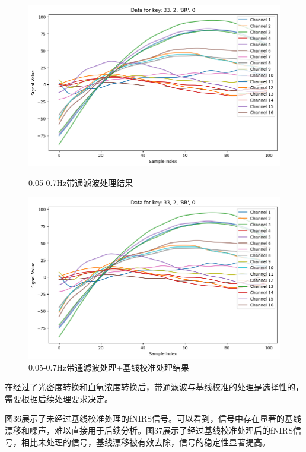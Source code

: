 \documentclass[a4paper,12pt]{article}
\begin{document}
\begin{figure}[h!]
    \begin{minipage}[t]{0.48\textwidth}
        \centering
        \includegraphics[width=\linewidth]{images/Design/fNIRS_processing/005-07+nobaseline.png}
        \caption{0.05-0.7Hz带通滤波处理结果}
    \end{minipage}
    \hfill
    \begin{minipage}[t]{0.48\textwidth}
        \centering
        \includegraphics[width=\linewidth]{images/Design/fNIRS_processing/005-07+baseline.png}
        \caption{0.05-0.7Hz带通滤波处理+基线校准处理结果}
    \end{minipage}
\end{figure}

\clearpage
在经过了光密度转换和血氧浓度转换后，带通滤波与基线校准的处理是选择性的，需要根据后续处理要求决定。

图36展示了未经过基线校准处理的fNIRS信号。可以看到，信号中存在显著的基线漂移和噪声，难以直接用于后续分析。图37展示了经过基线校准处理后的fNIRS信号，相比未处理的信号，基线漂移被有效去除，信号的稳定性显著提高。
\end{document}
